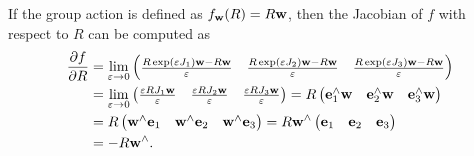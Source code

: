 If the group action is defined as $f_{\mathbf{w}}(R) = R\mathbf{w}$, then the Jacobian of $f$ with respect to $R$ can be computed as
\begin{align*}
\frac{\partial f}{\partial R} &= \lim_{\varepsilon \to 0} \begin{pmatrix} 
 	\frac{R\exp(\varepsilon J_1)\mathbf{w} - R\mathbf{w}}{\varepsilon} & 
 	\frac{R\exp(\varepsilon J_2)\mathbf{w} - R\mathbf{w}}{\varepsilon} &
 	\frac{R\exp(\varepsilon J_3)\mathbf{w} - R\mathbf{w}}{\varepsilon}
 \end{pmatrix} \\
 &= \lim_{\varepsilon \to 0} \begin{pmatrix} 
 	\frac{\varepsilon RJ_1\mathbf{w}}{\varepsilon} & 
 	\frac{\varepsilon RJ_2\mathbf{w}}{\varepsilon} &
 	\frac{\varepsilon RJ_3\mathbf{w}}{\varepsilon}
 \end{pmatrix}
  = R\begin{pmatrix} 
 	\mathbf{e}_1^\wedge\mathbf{w} & 
 	\mathbf{e}_2^\wedge\mathbf{w} & 
 	\mathbf{e}_3^\wedge\mathbf{w} 
 \end{pmatrix} \\
 &= R\begin{pmatrix} 
 	\mathbf{w}^\wedge\mathbf{e}_1 & 
 	\mathbf{w}^\wedge\mathbf{e}_2 & 
 	\mathbf{w}^\wedge\mathbf{e}_3 
 \end{pmatrix} 
  = R\mathbf{w}^\wedge \begin{pmatrix} 
 	\mathbf{e}_1 & 
 	\mathbf{e}_2 & 
 	\mathbf{e}_3 
 \end{pmatrix}\\
   &= -R\mathbf{w}^\wedge.
\end{align*}



